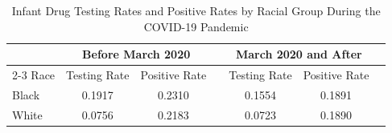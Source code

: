 \begin{table}[ht]
\centering
\caption{Infant Drug Testing Rates and Positive Rates by Racial Group During the COVID-19 Pandemic}
\begin{tabular}{lcccccc}
\hline
           & \multicolumn{2}{c}{Before March 2020} & & \multicolumn{2}{c}{March 2020 and After} \\
\cline{2-3} \cline{5-6}
Race       & Testing Rate & Positive Rate & & Testing Rate & Positive Rate \\
\hline
Black      & 0.1917       & 0.2310        & & 0.1554       & 0.1891 \\
White      & 0.0756       & 0.2183        & & 0.0723       & 0.1890 \\
\hline
\end{tabular}
\label{tab:covid_testing_by_race_period}
\end{table}